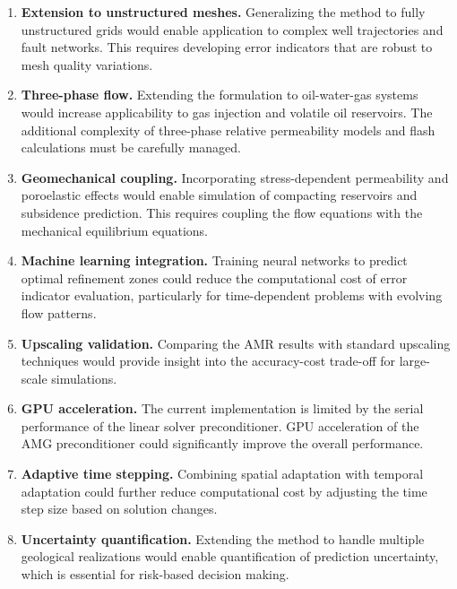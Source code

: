 \begin{enumerate}
    \item \textbf{Extension to unstructured meshes.} Generalizing the method to fully unstructured grids would enable application to complex well trajectories and fault networks. This requires developing error indicators that are robust to mesh quality variations.

    \item \textbf{Three-phase flow.} Extending the formulation to oil-water-gas systems would increase applicability to gas injection and volatile oil reservoirs. The additional complexity of three-phase relative permeability models and flash calculations must be carefully managed.

    \item \textbf{Geomechanical coupling.} Incorporating stress-dependent permeability and poroelastic effects would enable simulation of compacting reservoirs and subsidence prediction. This requires coupling the flow equations with the mechanical equilibrium equations.

    \item \textbf{Machine learning integration.} Training neural networks to predict optimal refinement zones could reduce the computational cost of error indicator evaluation, particularly for time-dependent problems with evolving flow patterns.

    \item \textbf{Upscaling validation.} Comparing the AMR results with standard upscaling techniques would provide insight into the accuracy-cost trade-off for large-scale simulations.

    \item \textbf{GPU acceleration.} The current implementation is limited by the serial performance of the linear solver preconditioner. GPU acceleration of the AMG preconditioner could significantly improve the overall performance.

    \item \textbf{Adaptive time stepping.} Combining spatial adaptation with temporal adaptation could further reduce computational cost by adjusting the time step size based on solution changes.

    \item \textbf{Uncertainty quantification.} Extending the method to handle multiple geological realizations would enable quantification of prediction uncertainty, which is essential for risk-based decision making.
\end{enumerate}

